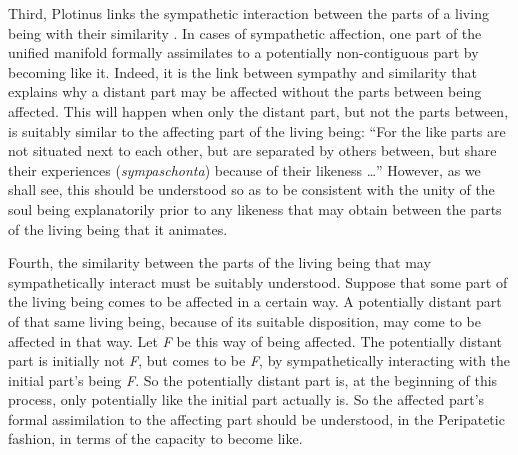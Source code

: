 Third, Plotinus links the sympathetic interaction between the parts of a living being with their similarity \citep{Emilsson:1988uq,Emilsson:2015wf}. In cases of sympathetic affection, one part of the unified manifold formally assimilates to a potentially non-contiguous part by becoming like it. Indeed, it is the link between sympathy and similarity that explains why a distant part may be affected without the parts between being affected. This will happen when only the distant part, but not the parts between, is suitably similar to the affecting part of the living being: ``For the like parts are not situated next to each other, but are separated by others between, but share their experiences (\emph{sympaschonta}) because of their likeness \ldots'' However, as we shall see, this should be understood so as to be consistent with the unity of the soul being explanatorily prior to any likeness that may obtain between the parts of the living being that it animates.

Fourth, the similarity between the parts of the living being that may sympathetically interact must be suitably understood. Suppose that some part of the living being comes to be affected in a certain way. A potentially distant part of that same living being, because of its suitable disposition, may come to be affected in that way. Let \emph{F} be this way of being affected. The potentially distant part is initially not \emph{F}, but comes to be \emph{F}, by sympathetically interacting with the initial part's being \emph{F}. So the potentially distant part is, at the beginning of this process, only potentially like the initial part actually is. So the affected part's formal assimilation to the affecting part should be understood, in the Peripatetic fashion, in terms of the capacity to become like.

